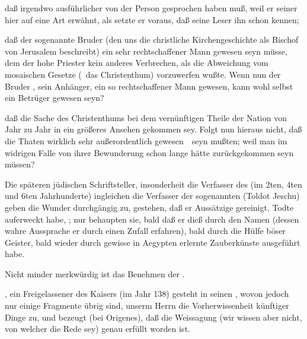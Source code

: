 \begin{aufza}
\begin{aufzb}
\begin{aufzc}
\item daß  irgendwo ausführlicher von der Person  gesprochen haben muß, weil er seiner hier auf eine Art erwähnt, als setzte er voraus, daß seine Leser ihn schon kennen;
\item daß der sogenannte Bruder  (den uns die christliche Kirchengeschichte als Bischof von Jerusalem beschreibt) ein sehr rechtschaffener Mann gewesen seyn müsse, dem der hohe Priester kein anderes Verbrechen, als die Abweichung vom mosaischen Gesetze (\dh\ das Christenthum) vorzuwerfen wußte. Wenn nun der Bruder , sein Anhänger, ein so rechtschaffener Mann gewesen, kann wohl  selbst ein Betrüger gewesen seyn?
\item daß die Sache des Christenthums bei dem vernünftigen Theile der Nation von Jahr zu Jahr in ein größeres Ansehen gekommen sey. Folgt nun hieraus nicht, daß die Thaten  wirklich sehr außerordentlich gewesen~\ seyn mußten; weil man im widrigen Falle von ihrer Bewunderung schon lange hätte zurückgekommen seyn müssen?
\end{aufzc}
\item Die späteren jüdischen Schriftsteller, insonderheit die Verfasser des  (im 2ten, 4ten und 6ten Jahrhunderte) ingleichen die Verfasser der sogenannten  (Toldot Jeschu) geben die Wunder  durchgängig zu, gestehen, daß er Aussätzige gereinigt, Todte auferweckt habe, \udgl ; nur behaupten sie, bald daß er dieß durch den Namen  (dessen wahre Aussprache er durch einen Zufall erfahren), bald durch die Hülfe böser Geister, bald wieder durch gewisse in Aegypten erlernte Zauberkünste ausgeführt habe.
\end{aufzb}
\item Nicht minder merkwürdig ist das Benehmen der .
\begin{aufzb}
\item {}, ein Freigelassener des Kaisers  (im Jahr 138) gesteht in seinen , wovon jedoch nur einige Fragmente übrig sind, unserm Herrn  die Vorherwissenheit künftiger Dinge zu, und bezeugt (bei Origenes), daß die Weissagung  (wir wissen aber nicht, von welcher die Rede sey) genau erfüllt worden ist.

\end{aufzb}
\end{aufza}
